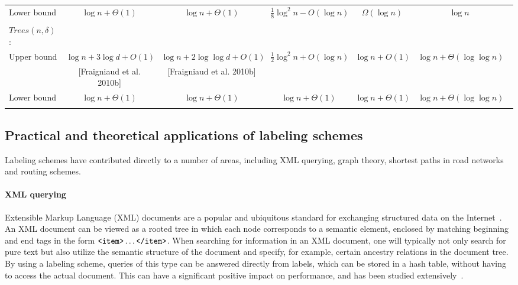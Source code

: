 \begin{table}[!ht]
{\begin{tabular}{lcccccc}
Lower bound &$\log n + \Theta(1)$ &$\log n + \Theta(1)$ &$\frac{1}{8}\log^2 n-O(\log n)$  &$ \Omega(\log n)$	&$\log n$	\\ 
&&&\cite{Gavoille2001}&\cite{Alstrup02NCA} \\
\hline 
			
$Trees(n,\delta)$:\\
Upper bound & $\log n + 3 \log d +O(1)$ &$\log n +2 \log \log d +O(1) $ &$\frac{1}{2}\log^2 n +O(\log n)$ 	&$\log n +O(1)$ 	&$\log n+ \Theta(\log \log n)$\\ 
& [Fraigniaud et al. 2010b] &[Fraigniaud et al. 2010b]	&&& \cite{Alstrup05}\\	\hdashline				

Lower  bound & $\log n + \Theta(1)$	&$\log n + \Theta(1)$  &$\log n + \Theta(1)$  &$\log n + \Theta(1)$  &$\log n + \Theta(\log \log n) $  \\ 
&&&&& \\ \hline						
  \end{tabular}}\label{table:bounded}
\end{table}
				
				

			
\subsection{Practical and theoretical applications of labeling schemes}\label{section:applications}
Labeling schemes have  contributed directly to a number of areas, including XML querying, graph theory, shortest paths in road networks and routing schemes.

\paragraph{XML querying}  
 Extensible Markup Language (XML) documents are a popular and ubiquitous standard for exchanging structured data on the Internet~\cite{Kaplan01}. An XML document can be viewed as a rooted tree in which each node corresponds to a semantic element, enclosed by matching beginning and end tags in the form $\verb+<item>+\dots\verb+</item>+$. When searching for information in an XML document, one will typically not only search for pure text but also utilize the semantic structure of the document and specify, for example, certain ancestry relations in the document tree. By using a labeling scheme, queries of this type can be answered directly from labels, which can be stored in a hash table, without having to access the actual document. 
 This can have a significant positive impact on performance, and has been studied extensively~\cite{Cohen02,lu2013xml,harder2007node,Kaplan01,wu2004prime,cohen10journal}.

